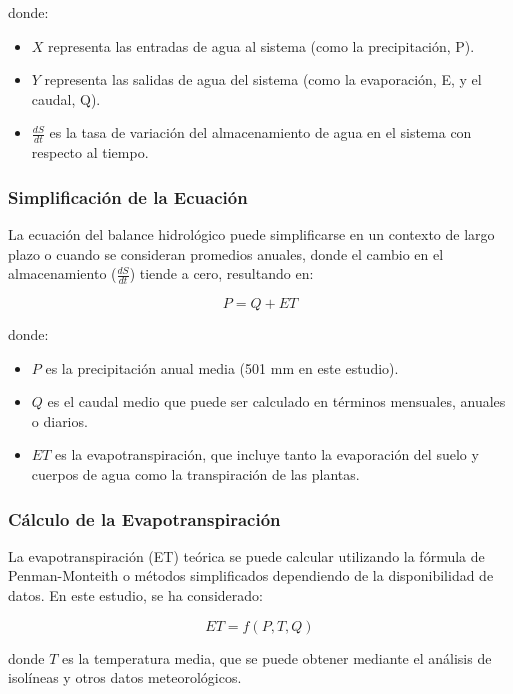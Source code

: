 \documentclass{article} %
\begin{document}
donde:

\begin{itemize}
    \item $X$ representa las entradas de agua al sistema (como la precipitación, P).
    \item $Y$ representa las salidas de agua del sistema (como la evaporación, E, y el caudal, Q).
    \item $\frac{dS}{dt}$ es la tasa de variación del almacenamiento de agua en el sistema con respecto al tiempo.
\end{itemize}

\subsubsection{Simplificación de la Ecuación}

La ecuación del balance hidrológico puede simplificarse en un contexto de largo plazo o cuando se consideran promedios anuales, donde el cambio en el almacenamiento ($\frac{dS}{dt}$) tiende a cero, resultando en:

\begin{equation}
    P = Q + ET
\end{equation}

donde:
\begin{itemize}
    \item $P$ es la precipitación anual media (501 mm en este estudio).
    \item $Q$ es el caudal medio que puede ser calculado en términos mensuales, anuales o diarios.
    \item $ET$ es la evapotranspiración, que incluye tanto la evaporación del suelo y cuerpos de agua como la transpiración de las plantas.
\end{itemize}

\subsubsection{Cálculo de la Evapotranspiración}

La evapotranspiración (ET) teórica se puede calcular utilizando la fórmula de Penman-Monteith o métodos simplificados dependiendo de la disponibilidad de datos. En este estudio, se ha considerado:

\begin{equation}
    ET = f(P, T, Q)
\end{equation}

donde $T$ es la temperatura media, que se puede obtener mediante el análisis de isolíneas y otros datos meteorológicos.
\end{document}
